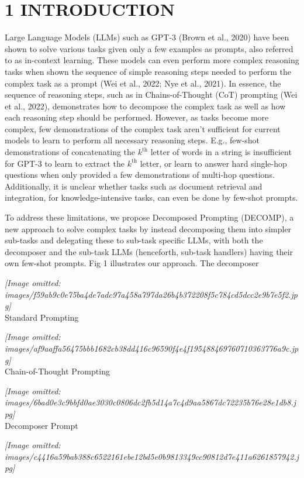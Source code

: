 \documentclass[
]{article}
\begin{document}
\section{1 INTRODUCTION}\label{introduction}

Large Language Models (LLMs) such as GPT-3 (Brown et al., 2020) have
been shown to solve various tasks given only a few examples as prompts,
also referred to as in-context learning. These models can even perform
more complex reasoning tasks when shown the sequence of simple reasoning
steps needed to perform the complex task as a prompt (Wei et al., 2022;
Nye et al., 2021). In essence, the sequence of reasoning steps, such as
in Chains-of-Thought (CoT) prompting (Wei et al., 2022), demonstrates
how to decompose the complex task as well as how each reasoning step
should be performed. However, as tasks become more complex, few
demonstrations of the complex task aren't sufficient for current models
to learn to perform all necessary reasoning steps. E.g., few-shot
demonstrations of concatenating the \(k^{\text{th}}\) letter of words in
a string is insufficient for GPT-3 to learn to extract the
\(k^{\text{th}}\) letter, or learn to answer hard single-hop questions
when only provided a few demonstrations of multi-hop questions.
Additionally, it is unclear whether tasks such as document retrieval and
integration, for knowledge-intensive tasks, can even be done by few-shot
prompts.

To address these limitations, we propose Decomposed Prompting (DECOMP),
a new approach to solve complex tasks by instead decomposing them into
simpler sub-tasks and delegating these to sub-task specific LLMs, with
both the decomposer and the sub-task LLMs (henceforth, sub-task
handlers) having their own few-shot prompts. Fig 1 illustrates our
approach. The decomposer

\textit{[Image omitted: images/f59ab9c0e75ba4de7adc97a458a797da26b4b372208f5c784cd5dcc2e9b7e5f2.jpg]}\\
Standard Prompting

\textit{[Image omitted: images/af9aaffa56475bbb1682cb38dd416c96590f4e4f195488469760710363776a9c.jpg]}\\
Chain-of-Thought Prompting

\textit{[Image omitted: images/6bad0e3c9bbfd0ae3030c0806dc2fb5d14a7c4d9aa5867dc72235b76e28e1db8.jpg]}\\
Decomposer Prompt

\textit{[Image omitted: images/c4416a59bab388c6522161ebe12bd5e0b9813349cc90812d7e411a6261857942.jpg]}
\end{document}
